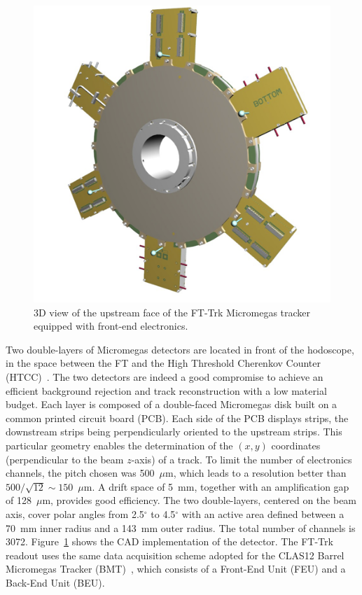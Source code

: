 \begin{figure}[th!]
\centering 
\includegraphics[width=1.0\columnwidth]{./fig/fttrk_layout.png}
\caption{3D view of the upstream face of the FT-Trk Micromegas tracker equipped with front-end electronics.}
\label{fig:ft-trck} 
\end{figure}

Two double-layers of Micromegas detectors are located in front of the hodoscope, in the space between the FT
and the High Threshold Cherenkov Counter (HTCC)~\cite{htcc}. The two detectors are indeed a good compromise
to achieve an efficient background rejection and track reconstruction with a low material budget. Each layer is
composed of a double-faced Micromegas disk built on a common printed circuit board (PCB). Each side of the PCB
displays strips, the downstream strips being perpendicularly oriented to the upstream strips. This particular geometry
enables the determination of the $(x,y)$ coordinates (perpendicular to the beam $z$-axis) of a track. To limit the
number of electronics channels, the pitch chosen was 500~$\mu$m, which leads to a resolution better than
$500/\sqrt{12} \sim 150$~$\mu$m. A drift space of 5~mm, together with an amplification gap of 128~$\mu$m,
provides good efficiency. The two double-layers, centered on the beam axis, cover polar angles from 2.5$^\circ$ to
4.5$^\circ$ with an active area defined between a 70~mm inner radius and a 143~mm outer radius. The total number of
channels is 3072. Figure~\ref{fig:ft-trck} shows the CAD implementation of the detector. The FT-Trk readout uses
the same data acquisition scheme adopted for the CLAS12 Barrel Micromegas Tracker (BMT)~\cite{mm}, which consists of
a Front-End Unit (FEU) and a Back-End Unit (BEU). 

